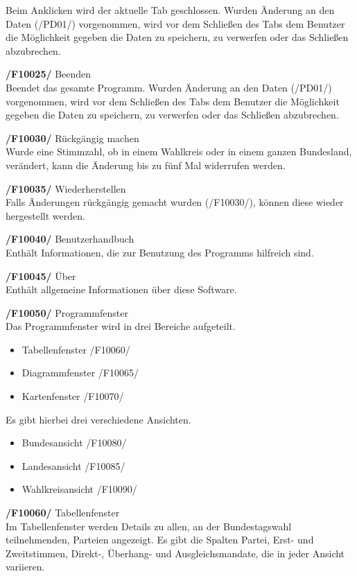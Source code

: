 \documentclass[10pt,a4paper]{article}
\begin{document}
\begin{description}
	Beim Anklicken wird der aktuelle Tab geschlossen. Wurden Änderung an den Daten (/PD01/) vorgenommen, wird vor dem Schließen des Tabs dem Benutzer die Möglichkeit gegeben die Daten zu speichern, zu verwerfen oder das Schließen abzubrechen.
	\item \textbf{/F10025/} Beenden \hfill \\
	Beendet das gesamte Programm. Wurden Änderung an den Daten (/PD01/) vorgenommen, wird vor dem Schließen des Tabs dem Benutzer die Möglichkeit gegeben die Daten zu speichern, zu verwerfen oder das Schließen abzubrechen.
	\item \textbf{/F10030/} Rückgängig machen \hfill \\
	Wurde eine Stimmzahl, ob in einem Wahlkreis oder in einem ganzen Bundesland, verändert, kann die Änderung bis zu fünf Mal widerrufen werden.
	\item \textbf{/F10035/} Wiederherstellen \hfill \\
	Falls Änderungen rückgängig gemacht wurden (/F10030/), können diese wieder hergestellt werden.
	\item \textbf{/F10040/} Benutzerhandbuch \hfill \\
	Enthält Informationen, die zur Benutzung des Programms hilfreich sind.
	\item \textbf{/F10045/} Über \hfill \\
	Enthält allgemeine Informationen über diese Software.
	\item \textbf{/F10050/} Programmfenster \hfill \\
	Das Programmfenster wird in drei Bereiche aufgeteilt.
	\begin{itemize}
		\item Tabellenfenster /F10060/
		\item Diagrammfenster /F10065/
		\item Kartenfenster /F10070/
	\end{itemize}
	Es gibt hierbei drei verschiedene Ansichten.
	\begin{itemize}
		\item Bundesansicht /F10080/
		\item Landesansicht /F10085/
		\item Wahlkreisansicht /F10090/
	\end{itemize}
	\item \textbf{/F10060/} Tabellenfenster \hfill \\
	Im Tabellenfenster werden Details zu allen, an der Bundestagswahl teilnehmenden, Parteien angezeigt.
	Es gibt die Spalten Partei, Erst- und Zweitstimmen, Direkt-, Überhang- und Ausgleichsmandate, die in jeder Ansicht variieren. \hfill \\

\end{description}
\end{document}
